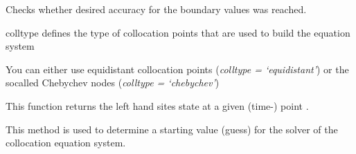 \documentclass[letterpaper,10pt,english]{sphinxmanual}
\begin{document}
\begin{fulllineitems}
\begin{fulllineitems}
\end{fulllineitems}


\begin{fulllineitems}
\label{pytrajectory:pytrajectory.trajectory.Trajectory.checkAccuracy}
Checks whether desired accuracy for the boundary values was reached.

\end{fulllineitems}


\begin{fulllineitems}
\label{pytrajectory:pytrajectory.trajectory.Trajectory.clear}
\end{fulllineitems}


\begin{fulllineitems}
\label{pytrajectory:pytrajectory.trajectory.Trajectory.colltype}
colltype defines the type of collocation points
that are used to build the equation system

You can either use equidistant collocation points (\emph{colltype = `equidistant'})
or the socalled Chebychev nodes (\emph{colltype = `chebychev'})

\end{fulllineitems}


\begin{fulllineitems}
\label{pytrajectory:pytrajectory.trajectory.Trajectory.dx}
This function returns the left hand sites state at a given (time-) point .

\end{fulllineitems}


\begin{fulllineitems}
\label{pytrajectory:pytrajectory.trajectory.Trajectory.getGuess}
This method is used to determine a starting value (guess) for the
solver of the collocation equation system.


\end{fulllineitems}
\end{fulllineitems}
\end{document}
